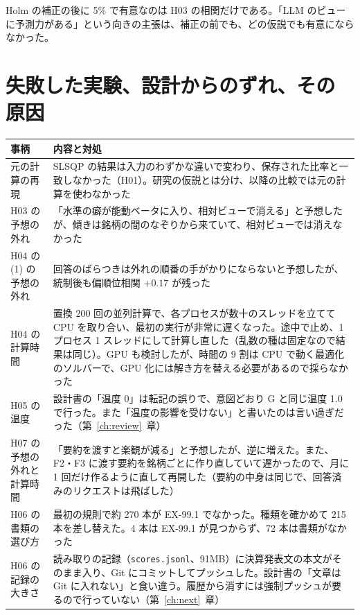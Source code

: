 \documentclass[xelatex,ja=standard,jafont=haranoaji,a4paper,10pt,openany]{bxjsreport}
\newcommand{\code}[1]{\texttt{#1}}
\newcommand{\chapref}[1]{第~\ref{#1}~章}
\begin{document}
Holm の補正の後に 5\% で有意なのは H03 の相関だけである。「LLM のビューに予測力がある」という向きの主張は、補正の前でも、どの仮説でも有意にならなかった。

\chapter{失敗した実験、設計からのずれ、その原因}\label{ch:failures}

\begin{longtable}{p{3.8cm}p{11.1cm}}
\toprule
\textbf{事柄} & \textbf{内容と対処} \\
\midrule
\endfirsthead
\bottomrule
\endfoot
元の計算の再現 & SLSQP の結果は入力のわずかな違いで変わり、保存された比率と一致しなかった（H01）。研究の仮説とは分け、以降の比較では元の計算を使わなかった \\
H03 の予想の外れ & 「水準の癖が能動ベータに入り、相対ビューで消える」と予想したが、傾きは銘柄の間のなぞりから来ていて、相対ビューでは消えなかった \\
H04 の (1) の予想の外れ & 回答のばらつきは外れの順番の手がかりにならないと予想したが、統制後も偏順位相関 $+0.17$ が残った \\
H04 の計算時間 & 置換 200 回の並列計算で、各プロセスが数十のスレッドを立てて CPU を取り合い、最初の実行が非常に遅くなった。途中で止め、1 プロセス 1 スレッドにして計算し直した（乱数の種は固定なので結果は同じ）。GPU も検討したが、時間の 9 割は CPU で動く最適化のソルバーで、GPU 化には解き方を替える必要があるので採らなかった \\
H05 の温度 & 設計書の「温度 0」は転記の誤りで、意図どおり G と同じ温度 1.0 で行った。また「温度の影響を受けない」と書いたのは言い過ぎだった（\chapref{ch:review}） \\
H07 の予想の外れと計算時間 & 「要約を渡すと楽観が減る」と予想したが、逆に増えた。また、F2・F3 に渡す要約を銘柄ごとに作り直していて遅かったので、月に 1 回だけ作るように直して再開した（要約の中身は同じで、回答済みのリクエストは飛ばした） \\
H06 の書類の選び方 & 最初の規則で約 270 本が EX-99.1 でなかった。種類を確かめて 215 本を差し替えた。4 本は EX-99.1 が見つからず、72 本は書類がなかった \\
H06 の記録の大きさ & 読み取りの記録（\code{scores.jsonl}、91MB）に決算発表文の本文がそのまま入り、Git にコミットしてプッシュした。設計書の「文章は Git に入れない」と食い違う。履歴から消すには強制プッシュが要るので行っていない（\chapref{ch:next}） \\
\end{longtable}
\end{document}
